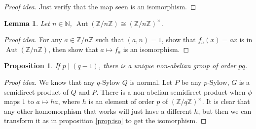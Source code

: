 \documentclass[paper=a4, fontsize=12pt]{scrartcl} %
\newtheorem{prop}[thm]{Proposition}
\newtheorem{lem}[thm]{Lemma}
\theoremstyle{definition}
\theoremstyle{remark}
\newcommand{\N}{\mathbb{N}}
\newcommand{\Z}{\mathbb{Z}}
\DeclareMathOperator{\aut}{Aut}
\numberwithin{equation}{section} %
\numberwithin{figure}{section} %
\numberwithin{table}{section} %
\begin{document}
\begin{proof}[Proof idea]
	Just verify that the map seen is an isomorphism.
\end{proof}
\begin{lem}
	Let $n \in \N$, $\aut(\Z/n\Z) \cong (\Z/n\Z)^{\times}$.
\end{lem}
\begin{proof}[Proof idea]
	For any $a \in \Z/n\Z$ such that $(a,n) = 1$, show that $f_a(x) = ax$ is in $\aut(\Z/n\Z)$, then show that $a \mapsto f_a$ is an isomorphism. 
\end{proof}
\begin{prop}
	If $p \mid (q-1)$, there is a unique non-abelian group of order $pq$.
\end{prop}
\begin{proof}[Proof idea]
	We know that any $q$-Sylow $Q$ is normal. Let $P$ be any $p$-Sylow, $G$ is a semidirect product of $Q$ and $P$. There is a non-abelian semidirect product when $\phi$ maps $1$ to $a \mapsto ha$, where $h$ is an element of order $p$ of $(\Z/q\Z)^{\times}$. It is clear that any other homomorphism that works will just have a different $h$, but then we can transform it as in proposition \ref{prop:iso} to get the isomorphism.
\end{proof}
\end{document}
